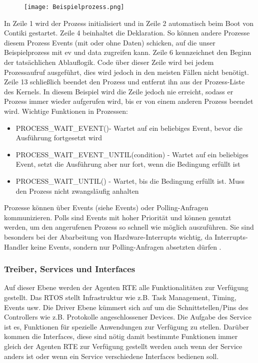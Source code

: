 \begin{figure}[h!]
	\centering
		\texttt{[image: Beispielprozess.png]}
	\label{Beispielprozess}
\end{figure}
In Zeile 1 wird der Prozess initialisiert und in Zeile 2 automatisch beim Boot von Contiki gestartet. Zeile 4 beinhaltet die
Deklaration. So k\"onnen andere Prozesse diesem Prozess Events (mit oder ohne Daten) schicken, auf die unser Beispielprozess 
mit ev und data zugreifen kann. Zeile 6 kennzeichnet den Beginn der tats\"achlichen Ablauflogik. Code \"uber dieser Zeile wird 
bei jedem Prozessaufruf ausgef\"uhrt, dies wird jedoch in den meisten F\"allen nicht ben\"otigt. Zeile 13 schlie{\ss}lich beendet
den Prozess und entfernt ihn aus der Prozess-Liste des Kernels. In diesem Beispiel wird die Zeile jedoch nie erreicht, sodass er
Prozess immer wieder aufgerufen wird, bis er von einem anderen Prozess beendet wird.
Wichtige Funktionen in Prozessen:
\begin{itemize}
\item PROCESS\_WAIT\_EVENT()- Wartet auf ein beliebiges Event, bevor die Ausf\"{u}hrung fortgesetzt wird
\item PROCESS\_WAIT\_EVENT\_UNTIL(condition) - Wartet auf ein beliebiges Event, setzt die Ausf\"{u}hrung aber nur fort, wenn die Bedingung erf\"{u}llt ist
\item PROCESS\_WAIT\_UNTIL() - Wartet, bis die Bedingung erf\"ullt ist. Muss den Prozess nicht zwangsl\"{a}ufig anhalten
\end{itemize}
Prozesse k\"onnen \"uber Events (siehe Events) oder Polling-Anfragen kommunizieren.  Polls sind Events mit hoher Priorit\"at und 
k\"onnen genutzt werden, um den angerufenen Prozess so schnell wie m\"oglich auszuf\"uhren. Sie
sind besonders bei der Abarbeitung von Hardware-Interrupts wichtig, da Interrupts-Handler keine Events, sondern nur
Polling-Anfragen absetzten d\"urfen \cite[vgl.][S. 7]{Walter:2010}.

\subsubsection{Treiber, Services und Interfaces}
Auf dieser Ebene werden der Agenten RTE alle Funktionalitäten zur Verfügung gestellt. Das RTOS stellt Infrastruktur wie z.B. Task Management, 
Timing, Events usw. Die Driver Ebene kümmert sich auf um die Schnittstellen/Pins des Controllers wie z.B. Protokolle angeschlossener
Devices\cite[S. 26]{Stasch:Hahn}. Die Aufgabe des Service ist es, Funktionen für spezielle Anwendungen zur Verfügung zu stellen.
Darüber kommen die Interfaces, diese sind nötig damit bestimmte Funktionen immer gleich der Agenten RTE zur Verfügung gestellt werden 
auch wenn der Service anders ist oder wenn ein Service verschiedene Interfaces bedienen soll\cite[S. 26]{Stasch:Hahn}.

